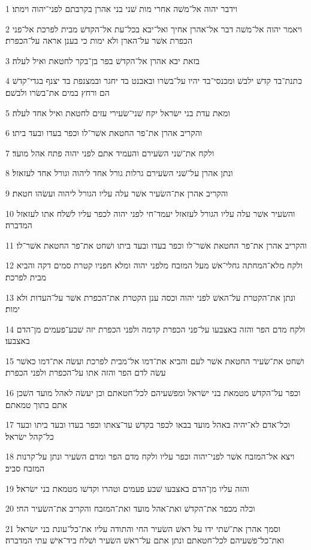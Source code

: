 \par 1 וידבר יהוה אל־משׁה אחרי מות שׁני בני אהרן בקרבתם לפני־יהוה וימתו׃
\par 2 ויאמר יהוה אל־משׁה דבר אל־אהרן אחיך ואל־יבא בכל־עת אל־הקדשׁ מבית לפרכת אל־פני הכפרת אשׁר על־הארן ולא ימות כי בענן אראה על־הכפרת׃
\par 3 בזאת יבא אהרן אל־הקדשׁ בפר בן־בקר לחטאת ואיל לעלה׃
\par 4 כתנת־בד קדשׁ ילבשׁ ומכנסי־בד יהיו על־בשׂרו ובאבנט בד יחגר ובמצנפת בד יצנף בגדי־קדשׁ הם ורחץ במים את־בשׂרו ולבשׁם׃
\par 5 ומאת עדת בני ישׂראל יקח שׁני־שׂעירי עזים לחטאת ואיל אחד לעלה׃
\par 6 והקריב אהרן את־פר החטאת אשׁר־לו וכפר בעדו ובעד ביתו׃
\par 7 ולקח את־שׁני השׂעירם והעמיד אתם לפני יהוה פתח אהל מועד׃
\par 8 ונתן אהרן על־שׁני השׂעירם גרלות גורל אחד ליהוה וגורל אחד לעזאזל׃
\par 9 והקריב אהרן את־השׂעיר אשׁר עלה עליו הגורל ליהוה ועשׂהו חטאת׃
\par 10 והשׂעיר אשׁר עלה עליו הגורל לעזאזל יעמד־חי לפני יהוה לכפר עליו לשׁלח אתו לעזאזל המדברה׃
\par 11 והקריב אהרן את־פר החטאת אשׁר־לו וכפר בעדו ובעד ביתו ושׁחט את־פר החטאת אשׁר־לו׃
\par 12 ולקח מלא־המחתה גחלי־אשׁ מעל המזבח מלפני יהוה ומלא חפניו קטרת סמים דקה והביא מבית לפרכת׃
\par 13 ונתן את־הקטרת על־האשׁ לפני יהוה וכסה ענן הקטרת את־הכפרת אשׁר על־העדות ולא ימות׃
\par 14 ולקח מדם הפר והזה באצבעו על־פני הכפרת קדמה ולפני הכפרת יזה שׁבע־פעמים מן־הדם באצבעו׃
\par 15 ושׁחט את־שׂעיר החטאת אשׁר לעם והביא את־דמו אל־מבית לפרכת ועשׂה את־דמו כאשׁר עשׂה לדם הפר והזה אתו על־הכפרת ולפני הכפרת׃
\par 16 וכפר על־הקדשׁ מטמאת בני ישׂראל ומפשׁעיהם לכל־חטאתם וכן יעשׂה לאהל מועד השׁכן אתם בתוך טמאתם׃
\par 17 וכל־אדם לא־יהיה באהל מועד בבאו לכפר בקדשׁ עד־צאתו וכפר בעדו ובעד ביתו ובעד כל־קהל ישׂראל׃
\par 18 ויצא אל־המזבח אשׁר לפני־יהוה וכפר עליו ולקח מדם הפר ומדם השׂעיר ונתן על־קרנות המזבח סביב׃
\par 19 והזה עליו מן־הדם באצבעו שׁבע פעמים וטהרו וקדשׁו מטמאת בני ישׂראל׃
\par 20 וכלה מכפר את־הקדשׁ ואת־אהל מועד ואת־המזבח והקריב את־השׂעיר החי׃
\par 21 וסמך אהרן את־שׁתי ידו על ראשׁ השׂעיר החי והתודה עליו את־כל־עונת בני ישׂראל ואת־כל־פשׁעיהם לכל־חטאתם ונתן אתם על־ראשׁ השׂעיר ושׁלח ביד־אישׁ עתי המדברה׃

